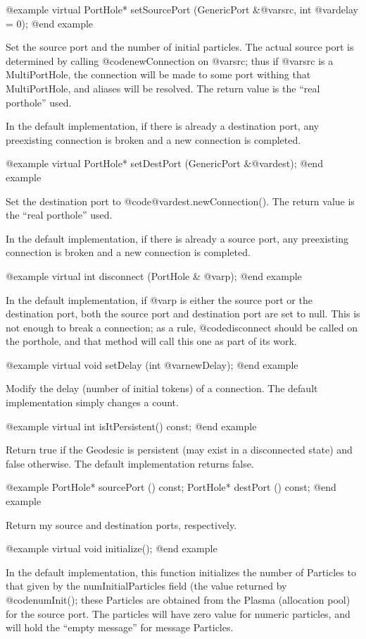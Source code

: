 @example
virtual PortHole* setSourcePort (GenericPort &@var{src}, int @var{delay} = 0);
@end example

Set the source port and the number of initial particles.  The actual
source port is determined by calling @code{newConnection} on @var{src};
thus if @var{src} is a MultiPortHole, the connection will be made to
some port withing that MultiPortHole, and aliases will be resolved.
The return value is the ``real porthole'' used.

In the default implementation, if there is already a destination port,
any preexisting connection is broken and a new connection is completed.


@example
virtual PortHole* setDestPort (GenericPort &@var{dest});
@end example

Set the destination port to @code{@var{dest}.newConnection()}.  The
return value is the ``real porthole'' used.

In the default implementation, if there is already a source port,
any preexisting connection is broken and a new connection is completed.

@example
virtual int disconnect (PortHole & @var{p});
@end example

In the default implementation, if @var{p} is either the source port or
the destination port, both the source port and destination port are set
to null.  This is not enough to break a connection; as a rule,
@code{disconnect} should be called on the porthole, and that method
will call this one as part of its work.

@example
virtual void setDelay (int @var{newDelay});
@end example

Modify the delay (number of initial tokens) of a connection.  The
default implementation simply changes a count.

@example
virtual int isItPersistent() const;
@end example

Return true if the Geodesic is persistent (may exist in a disconnected
state) and false otherwise.  The default implementation returns false.

@example
PortHole* sourcePort () const;
PortHole* destPort () const;
@end example

Return my source and destination ports, respectively.

@example
virtual void initialize();
@end example

In the default implementation, this function initializes the number of
Particles to that given by the numInitialParticles field (the value
returned by @code{numInit()}; these Particles are obtained from the
Plasma (allocation pool) for the source port.  The particles will
have zero value for numeric particles, and will hold the ``empty message''
for message Particles.

